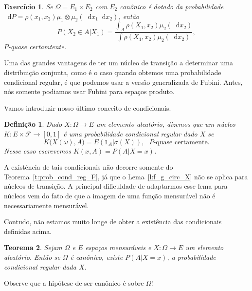 \documentclass[reqno, final]{book}
\newcommand*\1{\mathds{1}}
\newtheorem{theorem}{Teorema}[section]
\newtheorem{definition}[theorem]{Definição}
\newtheorem{exercise}[example]{Exercício}
\renewcommand*\d{\mathop{}\!\mathrm{d}}
\begin{document}
\begin{exercise}
  Se $\Omega = E_1 \times E_2$ com $E_2$ canônico é dotado da probabilidade $\d P = \rho(x_1, x_2) \mu_1 \otimes \mu_2 (\d x_1 \d x_2)$, então
  \begin{equation}
    P(X_2 \in A|X_1) = \frac{\int_A \rho(X_1, x_2) \mu_2(\d x_2)}{\int \rho(X_1, x_2) \mu_2(\d x_2)},
  \end{equation}
  $P$-quase certamtente.
\end{exercise}

Uma das grandes vantagens de ter um núcleo de transição a determinar uma distribuição conjunta, como é o caso quando obtemos uma probabilidade condicional regular, é que podemos usar a versão generalizada de Fubini.
Antes, nós somente podiamos usar Fubini para espaços produto.

Vamos introduzir nosso último conceito de condicionais.

\begin{definition}
  Dado $X:\Omega \to E$ um elemento aleatório, dizemos que um núcleo $K: E \times \mathcal{F} \to [0,1]$ é uma \emph{probabilidade condicional regular dado $X$} se
  \begin{equation}
    \label{e:K_prob_cond_reg_X}
    K\big( X(\omega), A\big) = E(\1_A|\sigma(X)), \text{ $P$-quase certamente.}
  \end{equation}
  Nesse caso escrevemos $K(x, A) = P(A|X = x)$.
\end{definition}

A existência de tais condicionais não decorre somente do Teorema~\ref{t:prob_cond_reg_F}, já que o Lema~\ref{l:f_g_circ_X} não se aplica para núcleos de transição.
A principal dificuldade de adaptarmos esse lema para núcleos vem do fato de que a imagem de uma função mensurável não é necessariamente mensurável.

Contudo, não estamos muito longe de obter a existência das condicionais definidas acima.

\begin{theorem}
  \label{t:prob_cond_reg_X}
  Sejam $\Omega$ e $E$ espaços mensuráveis e $X: \Omega \to E$ um elemento aleatório.
  Então se $\Omega$ é canônico, existe $P(A|X = x)$, a probabilidade condicional regular dada $X$.
\end{theorem}

Observe que a hipótese de ser canônico é sobre $\Omega$!
\end{document}
